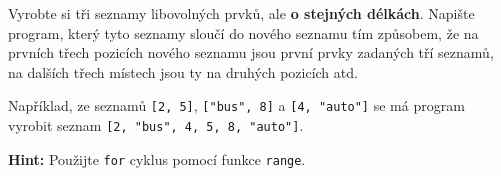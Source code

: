 \question[50]
Vyrobte si tři seznamy libovolných prvků, ale \textbf{o stejných délkách}.
Napište program, který tyto seznamy sloučí do nového seznamu tím způsobem, že na
prvních třech pozicích nového seznamu jsou první prvky zadaných tří seznamů, na
dalších třech místech jsou ty na druhých pozicích atd.

Například, ze seznamů \texttt{[2, 5]}, \texttt{["bus", 8]} a \texttt{[4,
			"auto"]} se má program vyrobit seznam \texttt{[2, "bus", 4, 5, 8,
			"auto"]}.

\textbf{Hint:} Použijte \texttt{for} cyklus pomocí funkce \texttt{range}.